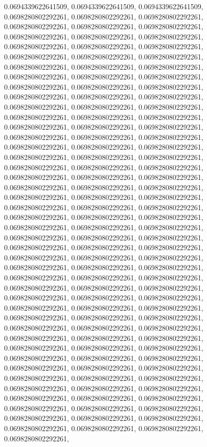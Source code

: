 \documentclass[
  ,man]{apa6}
\begin{document}
0.0694339622641509, 0.0694339622641509, 0.0694339622641509, 0.0698280802292261, 0.0698280802292261, 0.0698280802292261, 0.0698280802292261, 0.0698280802292261, 0.0698280802292261, 0.0698280802292261, 0.0698280802292261, 0.0698280802292261, 0.0698280802292261, 0.0698280802292261, 0.0698280802292261, 0.0698280802292261, 0.0698280802292261, 0.0698280802292261, 0.0698280802292261, 0.0698280802292261, 0.0698280802292261, 0.0698280802292261, 0.0698280802292261, 0.0698280802292261, 0.0698280802292261, 0.0698280802292261,
0.0698280802292261, 0.0698280802292261, 0.0698280802292261, 0.0698280802292261, 0.0698280802292261, 0.0698280802292261, 0.0698280802292261, 0.0698280802292261, 0.0698280802292261, 0.0698280802292261, 0.0698280802292261, 0.0698280802292261, 0.0698280802292261, 0.0698280802292261, 0.0698280802292261, 0.0698280802292261, 0.0698280802292261, 0.0698280802292261, 0.0698280802292261, 0.0698280802292261, 0.0698280802292261, 0.0698280802292261, 0.0698280802292261, 0.0698280802292261, 0.0698280802292261, 0.0698280802292261,
0.0698280802292261, 0.0698280802292261, 0.0698280802292261, 0.0698280802292261, 0.0698280802292261, 0.0698280802292261, 0.0698280802292261, 0.0698280802292261, 0.0698280802292261, 0.0698280802292261, 0.0698280802292261, 0.0698280802292261, 0.0698280802292261, 0.0698280802292261, 0.0698280802292261, 0.0698280802292261, 0.0698280802292261, 0.0698280802292261, 0.0698280802292261, 0.0698280802292261, 0.0698280802292261, 0.0698280802292261, 0.0698280802292261, 0.0698280802292261, 0.0698280802292261, 0.0698280802292261,
0.0698280802292261, 0.0698280802292261, 0.0698280802292261, 0.0698280802292261, 0.0698280802292261, 0.0698280802292261, 0.0698280802292261, 0.0698280802292261, 0.0698280802292261, 0.0698280802292261, 0.0698280802292261, 0.0698280802292261, 0.0698280802292261, 0.0698280802292261, 0.0698280802292261, 0.0698280802292261, 0.0698280802292261, 0.0698280802292261, 0.0698280802292261, 0.0698280802292261, 0.0698280802292261, 0.0698280802292261, 0.0698280802292261, 0.0698280802292261, 0.0698280802292261, 0.0698280802292261,
0.0698280802292261, 0.0698280802292261, 0.0698280802292261, 0.0698280802292261, 0.0698280802292261, 0.0698280802292261, 0.0698280802292261, 0.0698280802292261, 0.0698280802292261, 0.0698280802292261, 0.0698280802292261, 0.0698280802292261, 0.0698280802292261, 0.0698280802292261, 0.0698280802292261, 0.0698280802292261, 0.0698280802292261, 0.0698280802292261, 0.0698280802292261, 0.0698280802292261, 0.0698280802292261, 0.0698280802292261, 0.0698280802292261, 0.0698280802292261, 0.0698280802292261, 0.0698280802292261,
\end{document}
